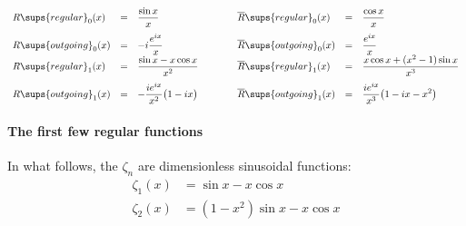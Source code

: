 \documentclass[letterpaper]{article}
\newcommand{\RBar}{\overline{R}}
\begin{document}
$$\begin{array}{lclclcl}
 R\sups{regular}_0(x) 
&=&
 \displaystyle{ \frac{\sin x}{x}}
&\qquad&
 \displaystyle{ \RBar\sups{regular}_0(x)  }
&=&
 \displaystyle{ \frac{\cos x}{x}
              }
\\[10pt]
 R\sups{outgoing}_0(x) 
&=&
 \displaystyle{ -i\frac{e^{ix}}{x}}
&\qquad&
 \displaystyle{ \RBar\sups{outgoing}_0(x) }
&=&
 \displaystyle{ \frac{e^{ix}}{x}}
\\
 R\sups{regular}_1(x) 
&=&
 \displaystyle{ \frac{\sin x - x\cos x}{x^2} }
&\qquad&
 \displaystyle{ \RBar\sups{regular}_1(x)  }
&=&
 \displaystyle{ \frac{x\cos x + (x^2-1)\sin x}{x^3}
              }
\\[10pt]
 R\sups{outgoing}_1(x) 
&=&
 \displaystyle{ -\frac{ie^{ix}}{x^2}\big(1-ix\big)}
&\qquad&
 \displaystyle{ \RBar\sups{outgoing}_1(x) }
&=&
 \displaystyle{ \frac{ie^{ix}}{x^3}\big(1-ix-x^2\big) }
\end{array}$$

\paragraph{The first few regular functions}

In what follows, the $\zeta_n$ are dimensionless sinusoidal functions:
\begin{align*}
 \zeta_1(x) &= \sin x - x \cos x \\
 \zeta_2(x) &= (1-x^2)\sin x - x \cos x
\end{align*}
\end{document}
